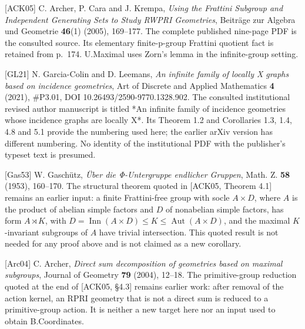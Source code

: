 \documentclass[
  11pt,
  a4paper,
]{article}
\begin{document}
{[}ACK05{]} C. Archer, P. Cara and J. Krempa, \emph{Using the Frattini
Subgroup and Independent Generating Sets to Study RWPRI Geometries},
Beiträge zur Algebra und Geometrie \textbf{46}(1) (2005), 169--177. The
complete published nine-page PDF is the consulted source. Its elementary
finite-p-group Frattini quotient fact is retained from p.~174. U.Maximal
uses Zorn's lemma in the infinite-group setting.

{[}GL21{]} N. Garcia-Colin and D. Leemans, \emph{An infinite family of
locally X graphs based on incidence geometries}, Art of Discrete and
Applied Mathematics \textbf{4} (2021), \#P3.01, DOI
10.26493/2590-9770.1328.902. The consulted institutional revised author
manuscript is titled *An infinite family of incidence geometries whose
incidence graphs are locally X*. Its Theorem 1.2 and Corollaries 1.3,
1.4, 4.8 and 5.1 provide the numbering used here; the earlier arXiv
version has different numbering. No identity of the institutional PDF
with the publisher's typeset text is presumed.

{[}Gas53{]} W. Gaschütz, \emph{Über die Φ-Untergruppe endlicher
Gruppen}, Math. Z. \textbf{58} (1953), 160--170. The structural theorem
quoted in {[}ACK05, Theorem 4.1{]} remains an earlier input: a finite
Frattini-free group with socle \(A\times D\), where \(A\) is the product
of abelian simple factors and \(D\) of nonabelian simple factors, has
form \(A\rtimes K\), with
\(D=\operatorname{Inn}(A\times D)\leq K\leq\operatorname{Aut}(A\times D)\),
and the maximal \(K\)-invariant subgroups of \(A\) have trivial
intersection. This quoted result is not needed for any proof above and
is not claimed as a new corollary.

{[}Arc04{]} C. Archer, \emph{Direct sum decomposition of geometries
based on maximal subgroups}, Journal of Geometry \textbf{79} (2004),
12--18. The primitive-group reduction quoted at the end of {[}ACK05,
§4.3{]} remains earlier work: after removal of the action kernel, an
RPRI geometry that is not a direct sum is reduced to a primitive-group
action. It is neither a new target here nor an input used to obtain
B.Coordinates.
\end{document}
